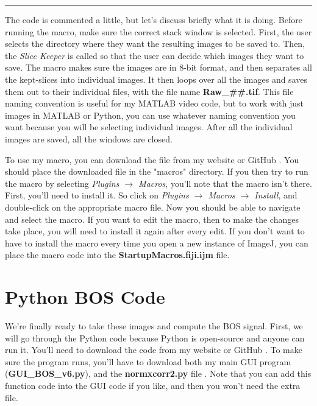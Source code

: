 \documentclass[letterpaper,12pt]{article}
\begin{document}
\par\noindent\rule{\textwidth}{0.4pt}

The code is commented a little, but let's discuss briefly what it is doing.  Before running the macro, make sure the correct stack window is selected.  First, the user selects the directory where they want the resulting images to be saved to.  Then, the \textcolor{myMagenta}{\textit{Slice Keeper}} is called so that the user can decide which images they want to save.  The macro makes sure the images are in $8$-bit format, and then separates all the kept-slices into individual images.  It then loops over all the images and saves them out to their individual files, with the file name \textbf{Raw\_\#\#.tif}.  This file naming convention is useful for my MATLAB video code, but to work with just images in MATLAB or Python, you can use whatever naming convention you want because you will be selecting individual images.  After all the individual images are saved, all the windows are closed.

To use my macro, you can download the file from my website \cite{JTE_Website} or GitHub \cite{JTE_GitHub}.  You should place the downloaded file in the "macros" directory.  If you then try to run the macro by selecting \textcolor{myMagenta}{\textit{Plugins $\rightarrow$ Macros}}, you'll note that the macro isn't there.  First, you'll need to install it.  So click on \textcolor{myMagenta}{\textit{Plugins $\rightarrow$ Macros $\rightarrow$ Install}}, and double-click on the appropriate macro file.  Now you should be able to navigate and select the macro.  If you want to edit the macro, then to make the changes take place, you will need to install it again after every edit.  If you don't want to have to install the macro every time you open a new instance of ImageJ, you can place the macro code into the \textbf{StartupMacros.fiji.ijm} file.

\section{Python BOS Code}
\label{sec:Python_BOS_Code}

We're finally ready to take these images and compute the BOS signal.  First, we will go through the Python code because Python is open-source and anyone can run it.  You'll need to download the code from my website \cite{JTE_Website} or GitHub \cite{JTE_GitHub}.  To make sure the program runs, you'll have to download both my main GUI program (\textbf{GUI\_BOS\_v6.py}), and the \textbf{normxcorr2.py} file \cite{Sabrewarrior_GitHub}.  Note that you can add this function code into the GUI code if you like, and then you won't need the extra file.
\end{document}
